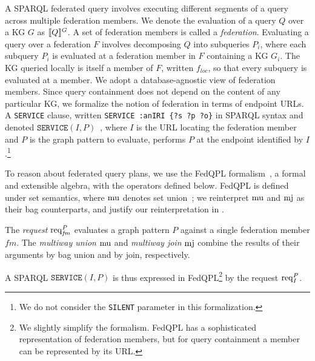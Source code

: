 A SPARQL federated query involves executing different segments of a query across multiple federation members.
We denote the evaluation of a query $Q$ over a \ac{KG} $G$ as $\llbracket Q \rrbracket^{G}$.
A set of federation members is called a \emph{federation}.
Evaluating a query over a federation $F$ involves decomposing $Q$ into subqueries $P_i$, where each subquery $P_i$ is evaluated at a federation member in $F$ containing a \ac{KG} $G_i$.
The \ac{KG} queried locally is itself a member of $F$, written $f_{\mathit{loc}}$, so that every subquery is evaluated at a member.
We adopt a database-agnostic view of federation members.
Since query containment does not depend on the content of any particular \ac{KG}, we formalize the notion of federation in terms of endpoint URLs.
A \texttt{SERVICE} clause, written \texttt{SERVICE :anIRI \{?s ?p ?o\}} in SPARQL syntax and denoted $\texttt{SERVICE}(I, P)$~\cite{w3SPARQLFederated}, where $I$ is the URL locating the federation member and $P$ is the graph pattern to evaluate, performs $P$ at the endpoint identified by $I$.\footnote{We do not consider the \texttt{SILENT} parameter in this formalization.}

To reason about federated query plans, we use the FedQPL formalism~\cite{Cheng2021}, a formal and extensible algebra, with the operators defined below.
FedQPL is defined under set semantics, where $\operatorname{mu}$ denotes set union~\cite[Def.~6]{Cheng2021}; we reinterpret $\operatorname{mu}$ and $\operatorname{mj}$ as their bag counterparts, and justify our reinterpretation in .

\begin{definition}\label{def_fedqpl}
  The \emph{request} $\operatorname{req}_{\mathit{fm}}^{P}$ evaluates a graph pattern $P$ against a single federation member $\mathit{fm}$.
  The \emph{multiway union} $\operatorname{mu}$ and \emph{multiway join} $\operatorname{mj}$ combine the results of their arguments by bag union and by join, respectively.
\end{definition}

A SPARQL $\texttt{SERVICE}(I, P)$ is thus expressed in FedQPL\footnote{We slightly simplify the formalism. FedQPL has a sophisticated representation of federation members, but for query containment a member can be represented by its URL.} by the request $\operatorname{req}_{I}^{P}$.
